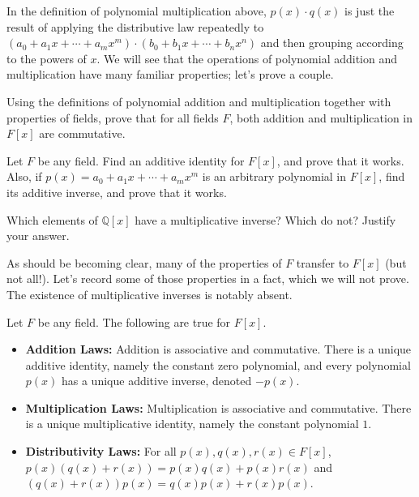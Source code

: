 In the definition of polynomial multiplication above, $p(x)\cdot q(x)$ is just the result of applying the distributive law repeatedly to $(a_0 + a_1x + \cdots + a_mx^m)\cdot(b_0 + b_1x + \cdots + b_nx^n)$ and then grouping according to the powers of $x$. We will see that the operations of polynomial addition and multiplication have many familiar properties; let's prove a couple. 

\begin{problem}
Using the definitions of polynomial addition and multiplication  together with properties of fields, prove that for all fields $F$, both addition and multiplication in $F[x]$ are commutative.
\end{problem}

\begin{problem}
Let $F$ be any field. Find an additive identity for $F[x]$, and prove that it works. Also, if $p(x) = a_0 + a_1x + \cdots + a_mx^m$ is an arbitrary polynomial in  $F[x]$, find its additive inverse, and prove that it works.
\end{problem}

\begin{problem}
Which elements of $\mathbb{Q}[x]$ have a multiplicative inverse? Which do not? Justify your answer.
\end{problem}

As should be becoming clear, many of the properties of $F$ transfer to $F[x]$ (but not all!). Let's record some of those properties in a fact, which we will not prove. The existence of multiplicative inverses is notably absent.

\begin{fact}\label{fact.PolyRingAlgProperties}Let $F$ be any field. The following are true for $F[x]$.
\begin{itemize}
\item \textbf{Addition Laws:} Addition is associative and commutative. There is a unique additive identity, namely the constant zero polynomial, and every polynomial $p(x)$ has a unique additive inverse, denoted $-p(x)$.
\item \textbf{Multiplication Laws:} Multiplication is associative and commutative. There is a unique multiplicative identity, namely the constant polynomial $1$.
\item \textbf{Distributivity Laws:} For all $p(x),q(x),r(x) \in F[x]$, $p(x)(q(x)+r(x)) = p(x)q(x)+p(x)r(x)$ and $(q(x)+r(x))p(x) = q(x)p(x)+r(x)p(x)$.
\end{itemize}
\end{fact}

